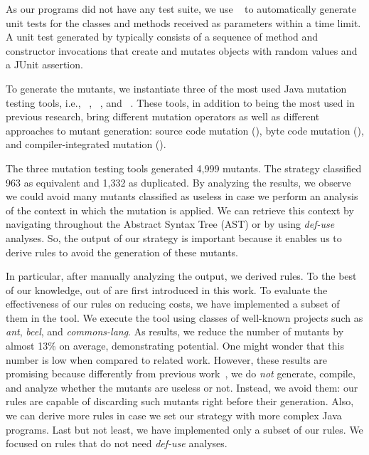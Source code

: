 As our programs did not have any test suite, we use \randoop{}~\cite{PACHECO:2007:1} to automatically
generate unit tests for the classes and methods received as parameters within a time limit.
A unit test generated by \randoop{} typically consists of a sequence of
method and constructor invocations that create and mutates objects with random values and a JUnit assertion.

To generate the mutants, we instantiate three of the most used Java mutation testing tools, i.e., \mujava{}~\cite{OFFUTT:2005:1, OFFUT:2006:1}, \major{}~\cite{JUST:2011:1}, and \pit{}~\cite{PIT:2017}.
These tools, in addition to being the most used in previous research, bring different mutation operators as well as different approaches to mutant generation: source code mutation (\mujava{}), byte code mutation (\pit{}), and compiler-integrated mutation (\major{}).

The three mutation testing tools generated 4,999 mutants. 
The strategy classified 963 as equivalent and 1,332 as duplicated.
By analyzing the results, we observe we could avoid many mutants classified as useless in case we perform an analysis of the context in which the mutation is applied.
We can retrieve this context by navigating throughout the Abstract Syntax Tree (AST) or by using \textit{def-use} analyses.
So, the output of our strategy is important because it enables us to derive rules to avoid the generation of these mutants. 

In particular, after manually analyzing the output, we derived \NumberOfIdentifiedHeuristics rules. 
To the best of our knowledge, \NumberOfNewHeuristics out of \NumberOfIdentifiedHeuristics are first introduced in this work.
To evaluate the effectiveness of our rules on reducing costs, we have implemented a subset of them in the \mujava{} tool. 
We execute the tool using classes of well-known projects such as \textit{ant}, \textit{bcel}, and \textit{commons-lang}. 
As results, we reduce the number of mutants by almost 13\% on average, demonstrating potential. 
One might wonder that this number is low when compared to related work. 
However, these results are promising because differently from previous work~\cite{PAPADAKIS:2015:1, KINTIS:2017:1, BALDWIN:1979:1, OFFUT:1996:1, OFFUT:1997:1, VOAS:1997:1, HIERONS:1999:1, GRUN:2009:1, SHULER:2010:1, SHULER:2013:1, SHULER:2009:1}, we do \textit{not} generate, compile, and analyze whether the mutants are useless or not. 
Instead, we avoid them: our rules are capable of discarding such mutants right before their generation. Also, we can derive more rules in case we set our strategy with more complex Java programs. Last but not least, we have implemented only a subset of our rules. We focused on rules that do not need \textit{def-use} analyses. 

